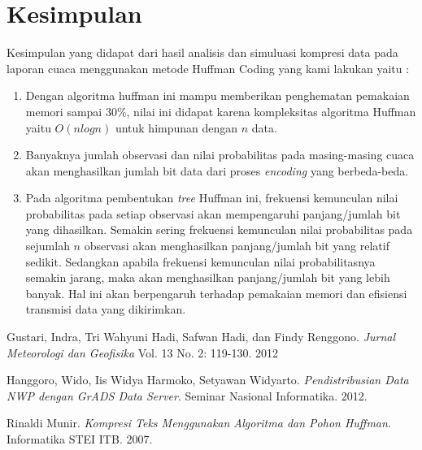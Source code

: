 \documentclass[journal]{IEEEtran}
\begin{document}
\section{Kesimpulan}
Kesimpulan yang didapat dari hasil analisis dan simuluasi kompresi data pada laporan cuaca menggunakan metode Huffman Coding yang kami lakukan yaitu :
\begin{enumerate}
	\item Dengan algoritma huffman ini mampu memberikan penghematan pemakaian memori sampai 30\%, nilai ini didapat karena kompleksitas algoritma Huffman yaitu $O(n log n)$ untuk himpunan dengan $n$ data.
	\item Banyaknya jumlah observasi dan nilai probabilitas pada masing-masing cuaca akan menghasilkan jumlah bit data dari proses \textit{encoding} yang berbeda-beda.
	\item Pada algoritma pembentukan \textit{tree} Huffman ini, frekuensi kemunculan nilai probabilitas pada setiap observasi akan mempengaruhi panjang/jumlah bit yang dihasilkan. Semakin sering frekuensi kemunculan nilai probabilitas pada sejumlah $n$ observasi akan menghasilkan panjang/jumlah bit yang relatif sedikit. Sedangkan apabila frekuensi kemunculan nilai probabilitasnya semakin jarang, maka akan menghasilkan panjang/jumlah bit yang lebih banyak. Hal ini akan berpengaruh terhadap pemakaian memori dan efisiensi transmisi data yang dikirimkan.
\end{enumerate}
\vspace*{1cm}
\begin{thebibliography}{5}
Gustari, Indra, Tri Wahyuni Hadi, Safwan Hadi, dan Findy Renggono. \textit{Jurnal Meteorologi dan Geofisika}
Vol. 13 No. 2: 119-130. 2012

Hanggoro, Wido, Iis Widya Harmoko, Setyawan Widyarto.
\textit{Pendistribusian Data NWP dengan GrADS Data Server}.
Seminar Nasional Informatika. 2012.

Rinaldi Munir.
\textit{Kompresi Teks Menggunakan Algoritma dan Pohon Huffman}. Informatika STEI ITB. 2007.
\end{thebibliography}
\end{document}
